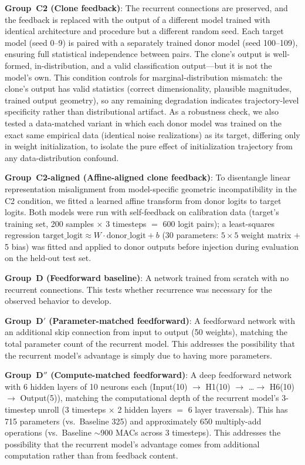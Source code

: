 \documentclass[10pt]{article}
\begin{document}
\textbf{Group~C2 (Clone feedback)}: The recurrent connections are preserved, and the feedback is replaced with the output of a different model trained with identical architecture and procedure but a different random seed. Each target model (seed 0--9) is paired with a separately trained donor model (seed 100--109), ensuring full statistical independence between pairs. The clone's output is well-formed, in-distribution, and a valid classification output---but it is not the model's own. This condition controls for marginal-distribution mismatch: the clone's output has valid statistics (correct dimensionality, plausible magnitudes, trained output geometry), so any remaining degradation indicates trajectory-level specificity rather than distributional artifact. As a robustness check, we also tested a data-matched variant in which each donor model was trained on the exact same empirical data (identical noise realizations) as its target, differing only in weight initialization, to isolate the pure effect of initialization trajectory from any data-distribution confound.

\textbf{Group~C2-aligned (Affine-aligned clone feedback)}: To disentangle linear representation misalignment from model-specific geometric incompatibility in the C2 condition, we fitted a learned affine transform from donor logits to target logits. Both models were run with self-feedback on calibration data (target's training set, 200 samples $\times$ 3 timesteps $=$ 600 logit pairs); a least-squares regression $\text{target\_logit} \approx W \cdot \text{donor\_logit} + b$ (30 parameters: $5 \times 5$ weight matrix $+$ 5 bias) was fitted and applied to donor outputs before injection during evaluation on the held-out test set.

\textbf{Group~D (Feedforward baseline)}: A network trained from scratch with no recurrent connections. This tests whether recurrence was necessary for the observed behavior to develop.

\textbf{Group~D$'$ (Parameter-matched feedforward)}: A feedforward network with an additional skip connection from input to output (50 weights), matching the total parameter count of the recurrent model. This addresses the possibility that the recurrent model's advantage is simply due to having more parameters.

\textbf{Group~D$''$ (Compute-matched feedforward)}: A deep feedforward network with 6 hidden layers of 10 neurons each (Input(10) $\to$ H1(10) $\to$ \ldots $\to$ H6(10) $\to$ Output(5)), matching the computational depth of the recurrent model's 3-timestep unroll (3 timesteps $\times$ 2 hidden layers $=$ 6 layer traversals). This has 715 parameters (vs.\ Baseline 325) and approximately 650 multiply-add operations (vs.\ Baseline $\sim$900 MACs across 3 timesteps). This addresses the possibility that the recurrent model's advantage comes from additional computation rather than from feedback content.
\end{document}
